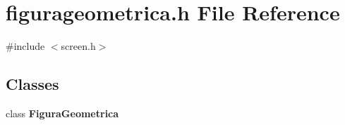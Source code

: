 \section{figurageometrica.\+h File Reference}
\label{figurageometrica_8h}
{\ttfamily \#include $<$screen.\+h$>$}\newline
\subsection*{Classes}
\begin{DoxyCompactItemize}
\item 
class \textbf{ Figura\+Geometrica}
\end{DoxyCompactItemize}
